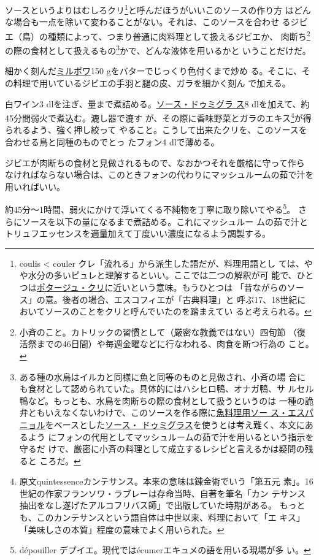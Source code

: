 \begin{recette}
ソースというよりはむしろクリ\footnote{coulis \textless{} couler
  クレ「流れる」から派生した語だが、料理用語とし
  ては、やや水分の多いピュレと理解するといい。ここでは二つの解釈が可
  能で、ひとつは\protect\hyperlink{}{ポタージュ・クリ}に近いという意味。もうひとつは
  「昔ながらのソース」の意。後者の場合、エスコフィエが「古典料理」と
  呼ぶ17、18世紀においてソースのことをクリと呼んでいたのを踏まえてい
  ると考えられる。}と呼んだほうがいいこのソースの作り方
はどんな場合も一点を除いて変わることがない。それは、このソースを合わせ
るジビエ（鳥）の種類によって、つまり普通に肉料理として扱えるジビエか、
肉断ち\footnote{小斉のこと。カトリックの習慣として（厳密な教義ではない）四旬節
  （復活祭までの46日間）や毎週金曜などに行なわれる、肉食を断つ行為の
  こと。}の際の食材として扱えるもの\footnote{ある種の水鳥はイルカと同様に魚と同等のものと見做され、小斉の場
  合にも食材として認められていた。具体的にはハシヒロ鴨、オナガ鴨、サ
  ルセル鴨など。もっとも、水鳥を肉断ちの際の食材として扱うというのは
  一種の詭弁ともいえなくないわけで、このソースを作る際に\protect\hyperlink{sauce-espagnole-maigre}{魚料理用ソー
  ス・エスパニョル}をベースとした\protect\hyperlink{sauce-demi-glace}{ソース・
  ドゥミグラス}を使うとは考え難く、本文にあるよう
  にフォンの代用としてマッシュルームの茹で汁を用いるという指示を守るだ
  けで、厳密に小斉の料理として成立するレシピと言えるかは疑問の残ると
  ころだ。}かで、どんな液体を用いるかと いうことだけだ。

細かく刻んだ\protect\hyperlink{mirepoix}{ミルポワ}150
gをバターでじっくり色付くまで炒め
る。そこに、その料理で用いているジビエの手羽と腿の皮、ガラを細かく刻ん
で加える。

白ワイン3
dlを注ぎ、\untiers{}量まで煮詰める。\protect\hyperlink{sauce-demi-glace}{ソース・ドゥミグラ
ス}8 dlを加えて、約45分間弱火で煮込む。漉し器で漉す
が、その際に香味野菜とガラのエキス\footnote{原文quintessenceカンテサンス。本来の意味は錬金術でいう「第五元
  素」。16世紀の作家フランソワ・ラブレーは存命当時、自著を筆名「カン
  テサンス抽出をなし遂げたアルコフリバス師」で出版していた時期がある。
  もっとも、このカンテサンスという語自体は中世以来、料理において「エ
  キス」「美味しさの本質」程度の意味でよく用いられた。}が得られるよう、強く押し絞って
やること。こうして出来たクリを、このソースを合わせる鳥と同種のものでとっ
たフォン4 dlで薄める。

ジビエが肉断ちの食材と見做されるもので、なおかつそれを厳格に守って作ら
なければならない場合は、このときフォンの代わりにマッシュルームの茹で汁を
用いればいい。

約45分〜1時間、弱火にかけて浮いてくる不純物を丁寧に取り除いてやる\footnote{dépouiller
  デプイエ。現代ではécumerエキュメの語を用いる現場が多 い。}。
さらにソースを\deuxtiers{}以下の量になるまで煮詰める。これにマッシュルー
ムの茹で汁とトリュフエッセンスを適量加えて丁度いい濃度になるよう調製する。


\end{recette}
